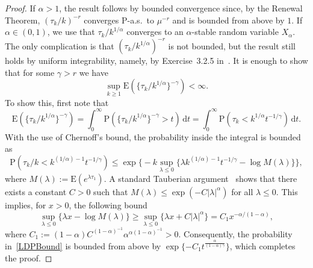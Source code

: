 \documentclass[11pt]{article}
\theoremstyle{definition}
\numberwithin{equation}{section}
\numberwithin{figure}{section}
\numberwithin{table}{section}
\newcommand{\ga}{\alpha}
\newcommand{\gga}{\gamma}
\newcommand{\gl}{\lambda}
\newcommand{\dd}{\mathrm{d}}
\newcommand\bP{\ensuremath{\mathrm{P}}}
\newcommand\bE{\ensuremath{\mathrm{E}}}
\begin{document}
\begin{proof}
If $\ga > 1$, the result follows by bounded convergence since, by the Renewal Theorem, $(\tau_k/k)^{- r}$ converges $\bP$-a.s.~to $\mu^{- r}$ and is bounded from above by $1$. If $\ga \in (0,1)$, we use that $\tau_k/k^{1/\ga}$ converges to an $\ga$-stable random variable $X_\ga$. The only complication is that $(\tau_k/k^{1/\ga})^{- r}$ is not bounded, but the result still holds by uniform integrability, namely, by Exercise~3.2.5 in~\cite{Du10}. It is enough to show that for some $\gga > r$ we have
\begin{equation}\label{eq:UItau}
\sup_{k\geq1} \bE(\{\tau_k/k^{1/\ga}\}^{- \gga}) < \infty.
\end{equation}
To show this, first note that
\begin{equation}\label{ExpectationTail}
\bE(\{\tau_k/k^{1/\ga}\}^{- \gga}) = \int_0^\infty \bP(\{\tau_k/k^{1/\ga}\}^{- \gga} > t) \, \dd t = \int_0^\infty \bP(\tau_k < k^{1/\ga} t^{- 1/\gga}) \, \dd t.
\end{equation}
With the use of Chernoff's bound, the probability inside the integral is bounded as
\begin{equation}\label{LDPBound}
\bP(\tau_k/k < k^{(1/\ga) - 1} t^{- 1/\gga}) \leq \exp \Big\{ - k \sup_{\gl\leq0} \{\gl k^{(1/\ga) - 1} t^{- 1/\gga} - \log M(\gl)\} \Big\},
\end{equation}
where $M(\gl) := \bE(e^{\gl \tau_1})$. A standard Tauberian argument~\cite[(5.22) of Chapter~XIII]{Feller71} shows that there exists a constant $C > 0$ such that $M(\gl) \leq \exp({- C |\gl|^\ga})$ for all $\gl \leq 0$. This implies, for $x > 0$, the following bound
\begin{equation}
\sup_{\gl\leq0} \{\gl x - \log M(\gl)\} \geq \sup_{\gl\leq0} \{\gl x + C |\gl|^\ga\} = C_1 x^{- \ga/(1 - \ga)},
\end{equation}
where $C_1 := (1 - \ga) C^{(1 - \ga)^{-1}} \ga^{\ga (1 - \ga)^{-1}} > 0$. Consequently, the probability in~\eqref{LDPBound} is bounded from above by $\exp\{- C_1 t^\frac{\ga}{(1 - \ga) \gga}\}$, which completes the proof.
\end{proof}
\end{document}
